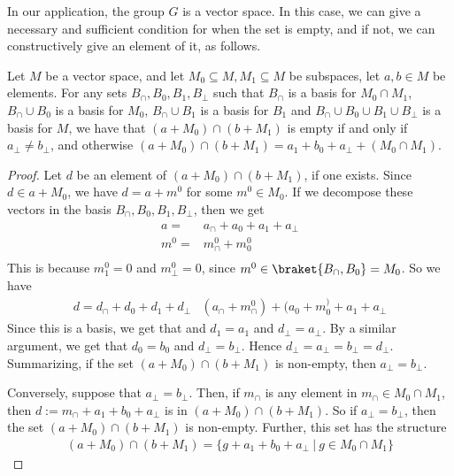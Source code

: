 In our application, the group $G$ is a vector space.
In this case, we can give a necessary and sufficient condition for when the set is empty, and if not, we can constructively give an element of it, as follows.
\begin{lemma}
	\label{thm:coset-intersection-with-basis}
	Let $M$ be a vector space, and let $M_0\subseteq M,M_1\subseteq M$ be subspaces, let $a,b\in M$ be elements. For any sets $B_\cap,B_0,B_1,B_\bot$ such that $B_\cap$ is a basis for $M_0\cap M_1$, $B_\cap \cup B_0$ is a basis for $M_0$, $B_\cap\cup B_1$ is a basis for $B_1$ and $B_\cap\cup B_0\cup B_1\cup B_\bot$ is a basis for $M$, we have that $(a+M_0)\cap (b+M_1)$ is empty if and only if $a_\bot\ne b_\bot$, and otherwise $(a+M_0)\cap(b+M_1)=a_1+b_0+a_\bot + (M_0\cap M_1)$.
\end{lemma}
\begin{proof}
	Let $d$ be an element of $(a+M_0)\cap (b+M_1)$, if one exists.
	Since $d\in a+M_0$, we have $d=a+m^0$ for some $m^0\in M_0$.
	If we decompose these vectors in the basis $B_\cap,B_0,B_1,B_\bot$, then we get
	\begin{align}
		a = & a_\cap + a_0 + a_1 + a_\bot \\
		m^0=& m_\cap^0 + m_0^0 \\
	\end{align}
	This is because $m_1^0=0$ and $m_\bot^0 = 0$, since $m^0\in \braket{B_\cap,B_0}=M_0$.
	So we have
	\begin{align}
		d = d_\cap+ d_0+d_1+d_\bot & (a_\cap + m_\cap^0) + (a_0+m_0^) + a_1+a_\bot
	\end{align}
	Since this is a basis, we get that and $d_1=a_1$ and $d_\bot=a_\bot$.
	By a similar argument, we get that $d_0=b_0$ and $d_\bot=b_\bot$.
	Hence $d_\bot=a_\bot=b_\bot=d_\bot$.
	Summarizing, if the set $(a+M_0)\cap (b+M_1)$ is non-empty, then $a_\bot=b_\bot$.
	
	Conversely, suppose that $a_\bot=b_\bot$.
	Then, if $m_\cap$ is any element in $m_\cap \in M_0\cap M_1$, then $d:=m_\cap + a_1+b_0+a_\bot$ is in $(a+M_0)\cap (b+M_1)$.
	So if $a_\bot=b_\bot$, then the set $(a+M_0)\cap (b+M_1)$ is non-empty.
	Further, this set has the structure
	\begin{align}
		(a+M_0)\cap (b+M_1)=\{g+a_1+b_0+a_\bot\ |\ g\in M_0\cap M_1\}
	\end{align}
\end{proof}

